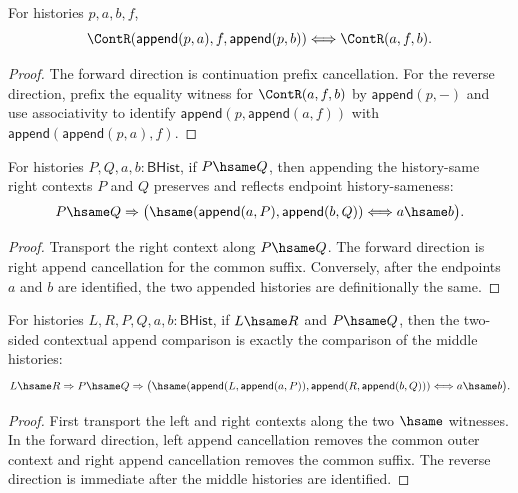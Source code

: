 \begin{theorem}
\label{thm:cont-prefix-iff}
For histories $p,a,b,f$,
$$
\ContR(\mathsf{append}(p,a),f,\mathsf{append}(p,b))
\Longleftrightarrow
\ContR(a,f,b).
$$
\end{theorem}
\begin{proof}
The forward direction is continuation prefix cancellation. For the reverse
direction, prefix the equality witness for $\ContR(a,f,b)$ by
$\mathsf{append}(p,-)$ and use associativity to identify
$\mathsf{append}(p,\mathsf{append}(a,f))$ with
$\mathsf{append}(\mathsf{append}(p,a),f)$.
\end{proof}

\begin{theorem}
\label{thm:append-hsame-right-context-cancel}
For histories $P,Q,a,b:\mathsf{BHist}$, if $P\hsame Q$, then appending the
history-same right contexts $P$ and $Q$ preserves and reflects endpoint
history-sameness:
$$
P\hsame Q\Rightarrow
\bigl(
\hsame(\mathsf{append}(a,P),\mathsf{append}(b,Q))
\Longleftrightarrow
a\hsame b
\bigr).
$$
\end{theorem}
\begin{proof}
Transport the right context along $P\hsame Q$. The forward direction is right append cancellation for the common suffix. Conversely, after the endpoints $a$ and $b$ are identified, the two appended histories are definitionally the same.
\end{proof}

\begin{theorem}
\label{thm:append-hsame-common-context-cancel}
For histories $L,R,P,Q,a,b:\mathsf{BHist}$, if $L\hsame R$ and $P\hsame Q$,
then the two-sided contextual append comparison is exactly the comparison of
the middle histories:
$$
L\hsame R\Rightarrow P\hsame Q\Rightarrow
\bigl(
\hsame(\mathsf{append}(L,\mathsf{append}(a,P)),
       \mathsf{append}(R,\mathsf{append}(b,Q)))
\Longleftrightarrow
a\hsame b
\bigr).
$$
\end{theorem}
\begin{proof}
First transport the left and right contexts along the two $\hsame$ witnesses.
In the forward direction, left append cancellation removes the common outer
context and right append cancellation removes the common suffix. The reverse
direction is immediate after the middle histories are identified.
\end{proof}

